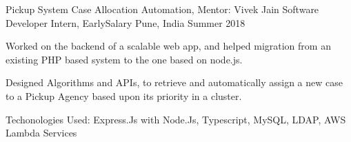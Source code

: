 \begin{cventries}
  \cventry
  {Pickup System Case Allocation Automation, Mentor: Vivek Jain}
  {Software Developer Intern, EarlySalary}
  {Pune, India}
  {Summer 2018}
  {
    \begin{cvitems}
	\item Worked on the backend of a scalable web app, and helped migration from an existing PHP based system to the one based on node.js.
\item Designed Algorithms and APIs, to retrieve and automatically assign a new case to a Pickup Agency based upon its priority in a cluster.
\item Techonologies Used: Express.Js with Node.Js, Typescript, MySQL,
LDAP, AWS Lambda Services
    \end{cvitems}
  }

\end{cventries}
